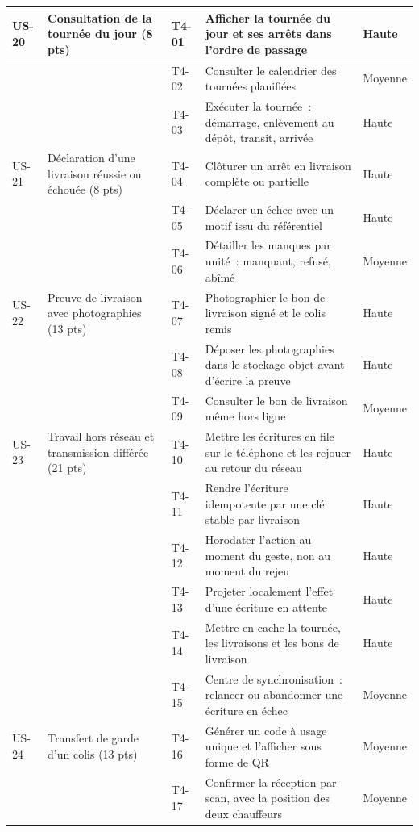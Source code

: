 \begin{small}
\begin{longtable}{L{1.1cm}L{3.0cm}L{1.2cm}L{7.0cm}L{1.4cm}}
US-20 & Consultation de la tournée du jour (8 pts) & T4-01 & Afficher la tournée du jour et ses arrêts dans l'ordre de passage & Haute \\
\hline
      &  & T4-02 & Consulter le calendrier des tournées planifiées & Moyenne \\
\hline
      &  & T4-03 & Exécuter la tournée~: démarrage, enlèvement au dépôt, transit, arrivée & Haute \\
\hline
US-21 & Déclaration d'une livraison réussie ou échouée (8 pts) & T4-04 & Clôturer un arrêt en livraison complète ou partielle & Haute \\
\hline
      &  & T4-05 & Déclarer un échec avec un motif issu du référentiel & Haute \\
\hline
      &  & T4-06 & Détailler les manques par unité~: manquant, refusé, abîmé & Moyenne \\
\hline
US-22 & Preuve de livraison avec photographies (13 pts) & T4-07 & Photographier le bon de livraison signé et le colis remis & Haute \\
\hline
      &  & T4-08 & Déposer les photographies dans le stockage objet avant d'écrire la preuve & Haute \\
\hline
      &  & T4-09 & Consulter le bon de livraison même hors ligne & Moyenne \\
\hline
US-23 & Travail hors réseau et transmission différée (21 pts) & T4-10 & Mettre les écritures en file sur le téléphone et les rejouer au retour du réseau & Haute \\
\hline
      &  & T4-11 & Rendre l'écriture idempotente par une clé stable par livraison & Haute \\
\hline
      &  & T4-12 & Horodater l'action au moment du geste, non au moment du rejeu & Haute \\
\hline
      &  & T4-13 & Projeter localement l'effet d'une écriture en attente & Haute \\
\hline
      &  & T4-14 & Mettre en cache la tournée, les livraisons et les bons de livraison & Haute \\
\hline
      &  & T4-15 & Centre de synchronisation~: relancer ou abandonner une écriture en échec & Moyenne \\
\hline
US-24 & Transfert de garde d'un colis (13 pts) & T4-16 & Générer un code à usage unique et l'afficher sous forme de QR & Moyenne \\
\hline
      &  & T4-17 & Confirmer la réception par scan, avec la position des deux chauffeurs & Moyenne \\

\end{longtable}
\end{small}

